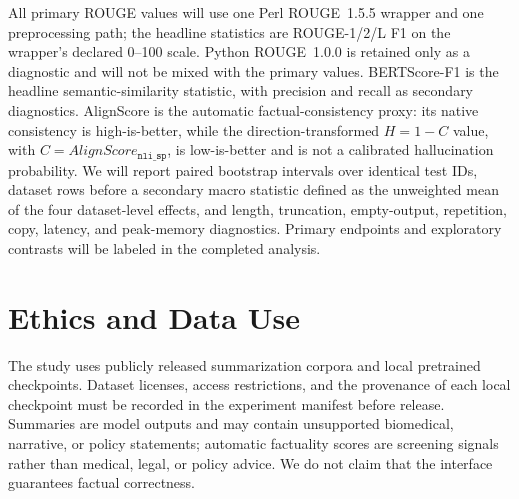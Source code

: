 \documentclass[11pt]{article}
\newcommand{\Rouge}{ROUGE\xspace}
\newcommand{\AlignScore}{AlignScore\xspace}
\newcommand{\BERTScore}{BERTScore\xspace}
\begin{document}
All primary \Rouge values will use one Perl \Rouge~1.5.5 wrapper and one preprocessing path; the headline statistics are \Rouge-1/2/L F1 on the wrapper's declared 0--100 scale. Python \Rouge~1.0.0 is retained only as a diagnostic and will not be mixed with the primary values. \BERTScore-F1 is the headline semantic-similarity statistic, with precision and recall as secondary diagnostics. \AlignScore is the automatic factual-consistency proxy: its native consistency is high-is-better, while the direction-transformed $H=1-C$ value, with $C=\AlignScore_{\texttt{nli\_sp}}$, is low-is-better and is not a calibrated hallucination probability. We will report paired bootstrap intervals over identical test IDs, dataset rows before a secondary macro statistic defined as the unweighted mean of the four dataset-level effects, and length, truncation, empty-output, repetition, copy, latency, and peak-memory diagnostics. Primary endpoints and exploratory contrasts will be labeled in the completed analysis.

\section{Ethics and Data Use}
\label{sec:ethics}
The study uses publicly released summarization corpora and local pretrained checkpoints. Dataset licenses, access restrictions, and the provenance of each local checkpoint must be recorded in the experiment manifest before release. Summaries are model outputs and may contain unsupported biomedical, narrative, or policy statements; automatic factuality scores are screening signals rather than medical, legal, or policy advice. We do not claim that the interface guarantees factual correctness.

\clearpage


\appendix
\end{document}
